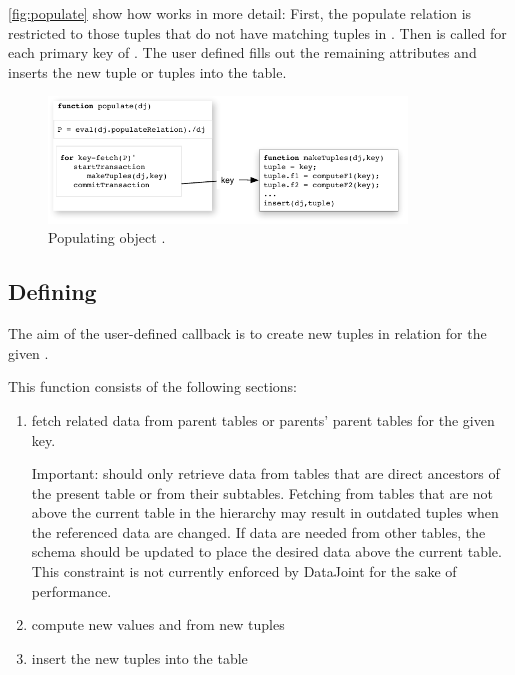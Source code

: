 \documentclass[10pt]{article}
\begin{document}
\autoref{fig:populate} show how  works in more detail: First, the populate relation  is restricted to those tuples that do not have matching tuples in .  Then  is called for each primary key of . The user defined  fills out the remaining attributes and inserts the new tuple or tuples into the table.  

\begin{figure}[h]
\center \includegraphics[width=0.85\textwidth]{populate.pdf}
\caption{Populating object .   }
\label{fig:populate}
\end{figure}


\subsection{Defining }
The aim of the user-defined  callback is to create new tuples in relation  for the given . 

This function consists of the following sections:
\begin{enumerate}
\item fetch related data from parent tables or parents' parent tables for the given key.  

{\color{red}Important:}  should only retrieve data from tables that are direct ancestors of the present table or from their subtables. Fetching from tables that are not above the current table in the hierarchy may result in outdated tuples when the referenced data are changed. If data are needed from other tables, the schema should be updated to place the desired data above the current table.  This constraint is not currently enforced by DataJoint for the sake of performance. 
\item compute new values and from new tuples
\item insert the new tuples into the table
\end{enumerate}
\end{document}
